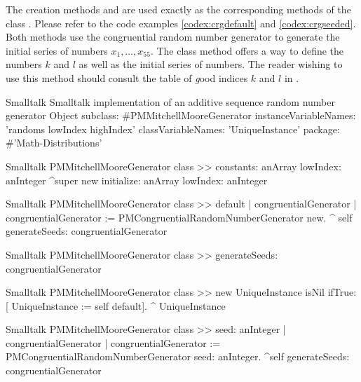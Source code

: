 The creation methods  and  are used exactly as
the corresponding methods of the class .
Please refer to the code examples \ref{codex:crgdefault} and \ref{codex:crgseeded}.
Both methods use the congruential random number generator to generate
the initial series of numbers $x_1,\ldots,x_{55}$.
The class method  offers a way to define the
numbers $k$ and $l$ as well as the initial series of numbers.
The reader wishing to use this method should consult the table of {\textsl good} indices $k$ and $l$ in \cite{Knuth2}.

%
\begin{listing}[label=lst:randomseq]{Smalltalk}
{Smalltalk implementation of an additive sequence random number generator}
Object subclass: #PMMitchellMooreGenerator
    instanceVariableNames: 'randoms lowIndex highIndex'
    classVariableNames: 'UniqueInstance'
    package: #'Math-Distributions'
\end{listing}

\begin{displaycode}{Smalltalk}
PMMitchellMooreGenerator class >> constants: anArray lowIndex: anInteger
    ^super new initialize: anArray lowIndex: anInteger
\end{displaycode}

\begin{displaycode}{Smalltalk}
PMMitchellMooreGenerator class >> default
    | congruentialGenerator |
    congruentialGenerator := PMCongruentialRandomNumberGenerator new.
    ^ self generateSeeds: congruentialGenerator
\end{displaycode}

\begin{displaycode}{Smalltalk}
PMMitchellMooreGenerator class >> generateSeeds: congruentialGenerator
\end{displaycode}

\begin{displaycode}{Smalltalk}
PMMitchellMooreGenerator class >> new
    UniqueInstance isNil
        ifTrue: [ UniqueInstance := self default].
    ^ UniqueInstance
\end{displaycode}

\begin{displaycode}{Smalltalk}
PMMitchellMooreGenerator class >> seed: anInteger
    | congruentialGenerator |
    congruentialGenerator := PMCongruentialRandomNumberGenerator 
                                                 seed: anInteger.
    ^self generateSeeds: congruentialGenerator
\end{displaycode}

